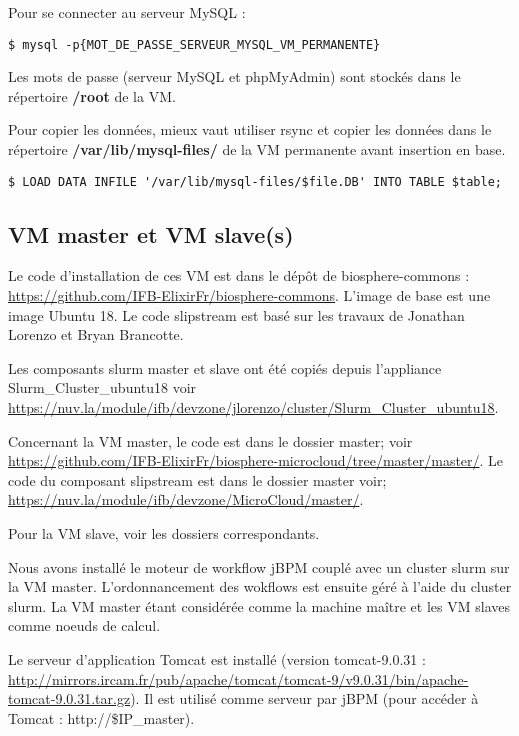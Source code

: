 Pour se connecter au serveur MySQL :
\begin{lstlisting}[style=bash]
$ mysql -p{MOT_DE_PASSE_SERVEUR_MYSQL_VM_PERMANENTE}
\end{lstlisting}

Les mots de passe (serveur MySQL et phpMyAdmin) sont stockés dans le répertoire \textbf{/root} de la VM.
\newline 

Pour copier les données, mieux vaut utiliser rsync et copier les données dans le répertoire \textbf{/var/lib/mysql-files/} de la VM permanente avant insertion en base.

\begin{lstlisting}[style=bash]
$ LOAD DATA INFILE '/var/lib/mysql-files/$file.DB' INTO TABLE $table;
\end{lstlisting}

\subsection{VM master et VM slave(s)} \label{master&slave}

Le code d’installation de ces VM est dans le dépôt de biosphere-commons : \url{https://github.com/IFB-ElixirFr/biosphere-commons}.
L'image de base est une image Ubuntu 18. Le code slipstream est basé sur les travaux de Jonathan Lorenzo et Bryan Brancotte. 

Les composants slurm master et slave ont été copiés depuis l'appliance Slurm\_Cluster\_ubuntu18 voir \url{https://nuv.la/module/ifb/devzone/jlorenzo/cluster/Slurm_Cluster_ubuntu18}.

Concernant la VM master, le code est dans le dossier master; voir
\url{https://github.com/IFB-ElixirFr/biosphere-microcloud/tree/master/master/}.
Le code du composant slipstream est dans le dossier master voir; \url{https://nuv.la/module/ifb/devzone/MicroCloud/master/}.

Pour la VM slave, voir les dossiers correspondants.\newline

Nous avons installé le moteur de workflow jBPM couplé avec un cluster slurm sur la VM master. L'ordonnancement des wokflows est ensuite géré à l'aide du cluster slurm. La VM master étant considérée comme la machine maître et les VM slaves comme noeuds de calcul.
\bigskip

Le serveur d'application Tomcat est installé (version tomcat-9.0.31 : \url{http://mirrors.ircam.fr/pub/apache/tomcat/tomcat-9/v9.0.31/bin/apache-tomcat-9.0.31.tar.gz}).
Il est utilisé comme serveur par jBPM (pour accéder à Tomcat : http://\$IP\_master).
\bigskip


